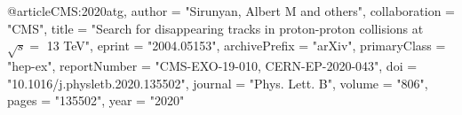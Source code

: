 @article{CMS:2020atg,
    author = "Sirunyan, Albert M and others",
    collaboration = "CMS",
    title = "{Search for disappearing tracks in proton-proton collisions at $\sqrt{s} =$ 13 TeV}",
    eprint = "2004.05153",
    archivePrefix = "arXiv",
    primaryClass = "hep-ex",
    reportNumber = "CMS-EXO-19-010, CERN-EP-2020-043",
    doi = "10.1016/j.physletb.2020.135502",
    journal = "Phys. Lett. B",
    volume = "806",
    pages = "135502",
    year = "2020"
}

